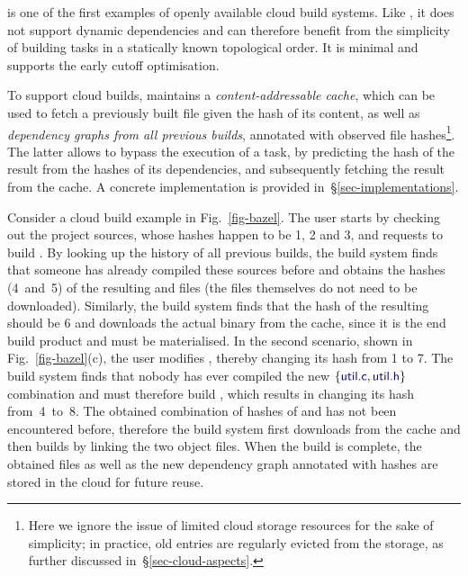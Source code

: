 \Bazel is one of the first examples of openly available cloud build systems.
Like \Make, it does not support dynamic dependencies and can therefore benefit
from the simplicity of building tasks in a statically known topological order.
It is minimal and supports the early cutoff optimisation.

To support cloud builds, \Bazel maintains a \emph{content-addressable cache},
which can be used to fetch a previously built file given the hash of its
content, as well as \emph{dependency graphs from all previous builds}, annotated
with observed file hashes\footnote{Here we ignore the issue of limited cloud
storage resources for the sake of simplicity; in practice, old entries are
regularly evicted from the storage, as further discussed
in~\S\ref{sec-cloud-aspects}.}. The latter allows to bypass the execution of
a task, by predicting the hash of the result from the hashes of its dependencies,
and subsequently fetching the result from the cache. A concrete implementation is
provided in~\S\ref{sec-implementations}.

Consider a cloud build example in Fig.~\ref{fig-bazel}. The user starts by
checking out the project sources, whose hashes happen to be 1, 2 and 3, and
requests to build . By looking up the history of all previous
builds, the build system finds that someone has already compiled these sources
before and obtains the hashes (4~and~5) of the resulting  and
 files (the files themselves do not need to be downloaded).
Similarly, the build system finds that the hash of the resulting 
should be 6 and downloads the actual binary from the cache, since it is the end
build product and must be materialised. In the second scenario, shown in
Fig.~\ref{fig-bazel}(c), the user modifies , thereby changing its
hash from 1 to 7. The build system finds that nobody has ever compiled the new
$\{\cmd{util.c}, \cmd{util.h}\}$ combination and must therefore build
, which results in changing its hash from~4~to~8. The obtained
combination of hashes of  and  has not been encountered
before, therefore the build system first downloads  from the cache
and then builds  by linking the two object files. When the build
is complete, the obtained files as well as the new dependency graph annotated
with hashes are stored in the cloud for future reuse.

